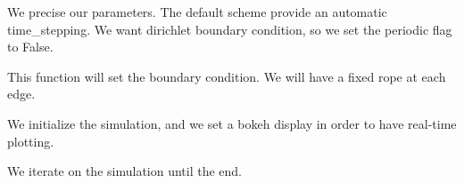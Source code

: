 \documentclass[letterpaper,10pt,english]{sphinxmanual}
\begin{document}
We precise our parameters. The default scheme provide an automatic
time\_stepping. We want dirichlet boundary condition, so we set the
periodic flag to False.

\begin{sphinxVerbatim}[commandchars=\\\{\}]
   
\end{sphinxVerbatim}

This function will set the boundary condition. We will have a fixed rope
at each edge.

\begin{sphinxVerbatim}[commandchars=\\\{\}]
   
    \PYG{p}{[}\PYG{p}{]}  
    \PYG{p}{[}\PYG{p}{]}  
    \PYG{p}{[}\PYG{p}{]}  
    \PYG{p}{[}\PYG{p}{]}  
      
\end{sphinxVerbatim}

We initialize the simulation, and we set a bokeh display in order to
have real-time plotting.

\begin{sphinxVerbatim}[commandchars=\\\{\}]
  
     
                         
\end{sphinxVerbatim}

We iterate on the simulation until the end.
\end{document}
